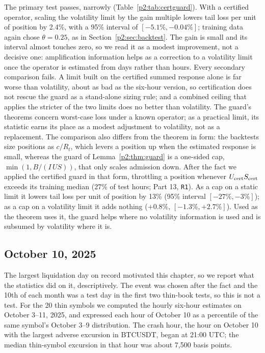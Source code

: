 The primary test passes, narrowly (Table~\ref{p2:tab:certguard}). With a certified operator, scaling the volatility limit by the gain multiple lowers tail loss per unit of position by 2.4\%, with a 95\% interval of $[-5.1\%,-0.04\%]$; training data again chose $\theta=0.25$, as in Section~\ref{p2:sec:backtest}. The gain is small and its interval almost touches zero, so we read it as a modest improvement, not a decisive one: amplification information helps as a correction to a volatility limit once the operator is estimated from days rather than hours. Every secondary comparison fails. A limit built on the certified summed response alone is far worse than volatility, about as bad as the six-hour version, so certification does not rescue the guard as a stand-alone sizing rule; and a combined ceiling that applies the stricter of the two limits does no better than volatility. The guard's theorems concern worst-case loss under a known operator; as a practical limit, its statistic earns its place as a modest adjustment to volatility, not as a replacement. The comparison also differs from the theorem in form: the backtests size positions as $c/R_t$, which levers a position up when the estimated response is small, whereas the guard of Lemma~\ref{p2:thm:guard} is a one-sided cap, $\min(1,B/(I\,U S))$, that only scales admission down. After the fact we applied the certified guard in that form, throttling a position whenever $U_{\rm cert}S_{\rm cert}$ exceeds its training median (27\% of test hours; Part 13, \texttt{R1}). As a cap on a static limit it lowers tail loss per unit of position by 13\% (95\% interval $[-27\%,-3\%]$); as a cap on a volatility limit it adds nothing ($+0.8\%$, $[-1.3\%,+2.7\%]$). Used as the theorem uses it, the guard helps where no volatility information is used and is subsumed by volatility where it is.

\subsection{October 10, 2025}\label{p2:sec:oct10}
The largest liquidation day on record motivated this chapter, so we report what the statistics did on it, descriptively. The event was chosen after the fact and the 10th of each month was a test day in the first two thin-book tests, so this is not a test. For the 20 thin symbols we computed the hourly six-hour estimates on October 3--11, 2025, and expressed each hour of October 10 as a percentile of the same symbol's October 3--9 distribution. The crash hour, the hour on October 10 with the largest adverse excursion in BTCUSDT, began at 21:00 UTC; the median thin-symbol excursion in that hour was about 7{,}500 basis points.

